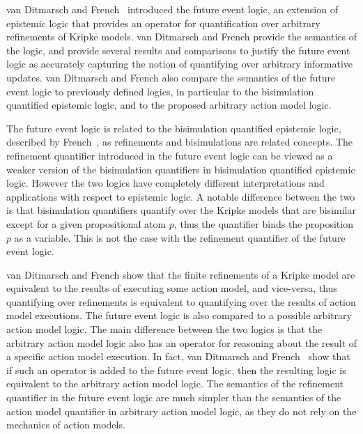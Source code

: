 van Ditmarsch and French~\cite{french2009simulation} introduced the future event
logic, an extension of epistemic logic that provides an operator for
quantification over arbitrary refinements of Kripke models. van Ditmarsch and
French provide the semantics of the logic, and provide several results and
comparisons to justify the future event logic as accurately capturing the notion
of quantifying over arbitrary informative updates. van Ditmarsch and French also 
compare the semantics of the future event logic to previously defined logics, in
particular to the bisimulation quantified epistemic logic, and to the proposed
arbitrary action model logic.

The future event logic is related to the bisimulation quantified epistemic
logic, described by French~\cite{french2006bisimulation}, as refinements and
bisimulations are related concepts. The refinement quantifier introduced in the
future event logic can be viewed as a weaker version of the bisimulation
quantifiers in bisimulation quantified epistemic logic. However the two logics
have completely different interpretations and applications with respect to
epistemic logic. A notable difference between the two is that bisimulation
quantifiers quantify over the Kripke models that are bisimilar except for a
given propositional atom $p$, thus the quantifier binds the proposition $p$ as a
variable. This is not the case with the refinement quantifier of the future
event logic. %

van Ditmarsch and French show that the finite refinements of a Kripke
model are equivalent to the results of executing some action model, and
vice-versa, thus quantifying over refinements is equivalent to quantifying over
the results of action model executions. The future event logic is also compared
to a possible arbitrary action model logic. The main difference between the two
logics is that the arbitrary action model logic also has an operator for
reasoning about the result of a specific action model execution. In fact, van
Ditmarsch and French~\cite{french2009simulation} show that if such an operator
is added to the future event logic, then the resulting logic is equivalent to
the arbitrary action model logic. The semantics of the refinement quantifier in
the future event logic are much simpler than the semantics of the action model
quantifier in arbitrary action model logic, as they do not rely on the mechanics
of action models.

